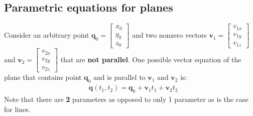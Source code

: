 \documentclass{article}
\begin{document}
\subsection*{Parametric equations for planes}

Consider an arbitrary point \(\mathbf{q}_0 = \begin{bmatrix} x_0 \\ y_0 \\ z_0 \end{bmatrix}\) and two nonzero vectors \(\mathbf{v}_1 = \begin{bmatrix} v_{1x} \\ v_{1y} \\ v_{1z} \end{bmatrix}\) and \(\mathbf{v}_2 = \begin{bmatrix} v_{2x} \\ v_{2y} \\ v_{2z} \end{bmatrix}\) that are {\bf not parallel}.
One possible vector equation of the plane that contains point \(\mathbf{q}_0\) and is parallel to \(\mathbf{v}_1\) and \(\mathbf{v}_2\) is:
\begin{align*}
& \mathbf{q}(t_1, t_2) = \mathbf{q}_0 + \mathbf{v}_1 t_1 + \mathbf{v}_2 t_2 
\end{align*}
Note that there are {\bf 2} parameters as opposed to only 1 parameter as is the case for lines.
\end{document}
